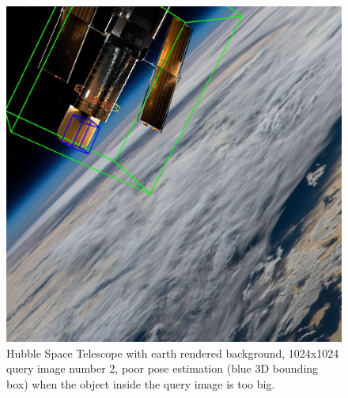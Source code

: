 \bigskip
\bigskip
\bigskip

\begin{figure}[H]
    \centering
    \includegraphics[width=0.70\linewidth]{data/fig1.jpg}
    \caption{Hubble Space Telescope with earth rendered background, 1024x1024 query image number 2, poor pose estimation (blue 3D bounding box) when the object inside the query image is too big.}
    \label{fig:fig1}
\end{figure}
